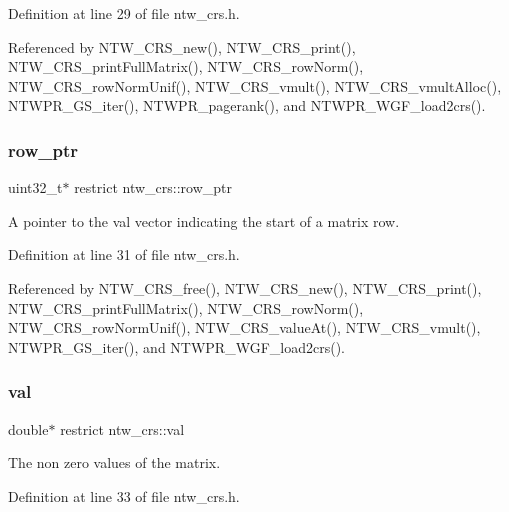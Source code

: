 Definition at line 29 of file ntw\+\_\+crs.\+h.



Referenced by N\+T\+W\+\_\+\+C\+R\+S\+\_\+new(), N\+T\+W\+\_\+\+C\+R\+S\+\_\+print(), N\+T\+W\+\_\+\+C\+R\+S\+\_\+print\+Full\+Matrix(), N\+T\+W\+\_\+\+C\+R\+S\+\_\+row\+Norm(), N\+T\+W\+\_\+\+C\+R\+S\+\_\+row\+Norm\+Unif(), N\+T\+W\+\_\+\+C\+R\+S\+\_\+vmult(), N\+T\+W\+\_\+\+C\+R\+S\+\_\+vmult\+Alloc(), N\+T\+W\+P\+R\+\_\+\+G\+S\+\_\+iter(), N\+T\+W\+P\+R\+\_\+pagerank(), and N\+T\+W\+P\+R\+\_\+\+W\+G\+F\+\_\+load2crs().

\mbox{\label{structntw__crs_abf117885ca226f2a82ff28dca7177c34}} 
\subsubsection{\texorpdfstring{row\+\_\+ptr}{row\_ptr}}
{\footnotesize\ttfamily uint32\+\_\+t$\ast$ restrict ntw\+\_\+crs\+::row\+\_\+ptr}

A pointer to the val vector indicating the start of a matrix\textquotesingle{} row. 

Definition at line 31 of file ntw\+\_\+crs.\+h.



Referenced by N\+T\+W\+\_\+\+C\+R\+S\+\_\+free(), N\+T\+W\+\_\+\+C\+R\+S\+\_\+new(), N\+T\+W\+\_\+\+C\+R\+S\+\_\+print(), N\+T\+W\+\_\+\+C\+R\+S\+\_\+print\+Full\+Matrix(), N\+T\+W\+\_\+\+C\+R\+S\+\_\+row\+Norm(), N\+T\+W\+\_\+\+C\+R\+S\+\_\+row\+Norm\+Unif(), N\+T\+W\+\_\+\+C\+R\+S\+\_\+value\+At(), N\+T\+W\+\_\+\+C\+R\+S\+\_\+vmult(), N\+T\+W\+P\+R\+\_\+\+G\+S\+\_\+iter(), and N\+T\+W\+P\+R\+\_\+\+W\+G\+F\+\_\+load2crs().

\mbox{\label{structntw__crs_a5ed2cc918a69051b395e9b151a66867f}} 
\subsubsection{\texorpdfstring{val}{val}}
{\footnotesize\ttfamily double$\ast$ restrict ntw\+\_\+crs\+::val}

The non zero values of the matrix. 

Definition at line 33 of file ntw\+\_\+crs.\+h.



